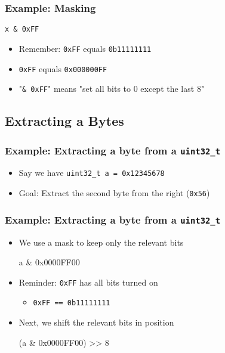 \begin{frame}
  \frametitle{Example: Masking}
  \begin{center}
    \texttt{x \& 0xFF}
  \end{center}
  \begin{itemize}
    \item Remember: \texttt{0xFF} equals \texttt{0b11111111}
    \item \texttt{0xFF} equals \texttt{0x000000FF}
    \item "\texttt{\& 0xFF}" means "set all bits to 0 except the last 8"
  \end{itemize}
\end{frame}

\subsection{Extracting a Bytes}
\frame{\tableofcontents[currentsubsection]}

\begin{frame}
  \frametitle{Example: Extracting a byte from a \texttt{uint32\_t}}
  \begin{itemize}
    \item Say we have \texttt{uint32\_t a = 0x12345678}
    \item Goal: Extract the second byte from the right (\texttt{0x56})
  \end{itemize}
\end{frame}

\begin{frame}
  \frametitle{Example: Extracting a byte from a \texttt{uint32\_t}}
  \begin{itemize}
    \item We use a mask to keep only the relevant bits
          \begin{center} \ttfamily
            a \& 0x0000FF00
          \end{center}
    \item Reminder: \texttt{0xFF} has all bits turned on
          \begin{itemize}
            \item \texttt{0xFF == 0b11111111}
          \end{itemize}
    \item Next, we shift the relevant bits in position
          \begin{center} \ttfamily
            (a \& 0x0000FF00) >> 8
          \end{center}
  \end{itemize}
\end{frame}
